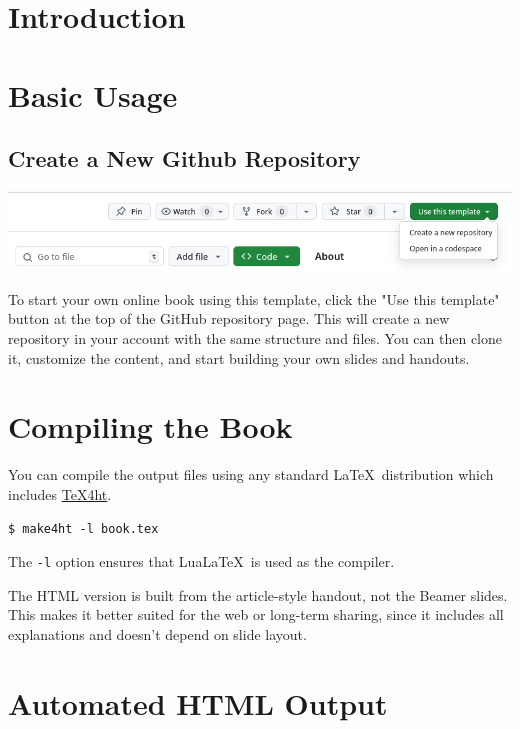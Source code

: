 \documentclass{book}
\begin{document}
\tableofcontents

\chapter{Introduction}



\chapter{Basic Usage}

\section{Create a New Github Repository}
\includegraphics[width=\textwidth]{img/template-use.png}

To start your own online book using this template, click the "Use this
template" button at the top of the GitHub repository page. This will create a
new repository in your account with the same structure and files. You can then
clone it, customize the content, and start building your own slides and
handouts.






\chapter{Compiling the Book}


You can compile the output files using any standard \LaTeX\ distribution which includes \href{https://www.tug.org/tex4ht/}{\TeX4ht}.

\begin{verbatim}
$ make4ht -l book.tex    
\end{verbatim}

The \verb|-l| option  ensures that Lua\LaTeX\ is used as the compiler. 


The HTML version is built from the article-style handout, not the Beamer slides.
This makes it better suited for the web or long-term sharing, since it includes
all explanations and doesn’t depend on slide layout.

\chapter{Automated HTML Output}
\end{document}

